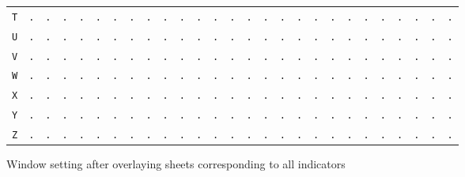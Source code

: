 \begin{figure}[H]
\begin{center}
{\begin{tabular}{c|cccccccccccccccccccccccccc}
				\texttt{T} & \texttt{.} & \texttt{.} & \texttt{.} & \texttt{.} & \texttt{.} & \texttt{.} & \texttt{.} & \texttt{.} & \texttt{.} & \texttt{.} & \texttt{.} & \texttt{.} & \texttt{.} & \texttt{.} & \texttt{.} & \texttt{.} & \texttt{.} & \texttt{.} & \texttt{.} & \texttt{.} & \texttt{.} & \texttt{.} & \texttt{.} & \texttt{.} & \texttt{.} & \texttt{.} \\
				\texttt{U} & \texttt{.} & \texttt{.} & \texttt{.} & \texttt{.} & \texttt{.} & \texttt{.} & \texttt{.} & \texttt{.} & \texttt{.} & \texttt{.} & \texttt{.} & \texttt{.} & \texttt{.} & \texttt{.} & \texttt{.} & \texttt{.} & \texttt{.} & \texttt{.} & \texttt{.} & \texttt{.} & \texttt{.} & \texttt{.} & \texttt{.} & \texttt{.} & \texttt{.} & \texttt{.} \\
				\texttt{V} & \texttt{.} & \texttt{.} & \texttt{.} & \texttt{.} & \texttt{.} & \texttt{.} & \texttt{.} & \texttt{.} & \texttt{.} & \texttt{.} & \texttt{.} & \texttt{.} & \texttt{.} & \texttt{.} & \texttt{.} & \texttt{.} & \texttt{.} & \texttt{.} & \texttt{.} & \texttt{.} & \texttt{.} & \texttt{.} & \texttt{.} & \texttt{.} & \texttt{.} & \texttt{.} \\
				\texttt{W} & \texttt{.} & \texttt{.} & \texttt{.} & \texttt{.} & \texttt{.} & \texttt{.} & \texttt{.} & \texttt{.} & \texttt{.} & \texttt{.} & \texttt{.} & \texttt{.} & \texttt{.} & \texttt{.} & \texttt{.} & \texttt{.} & \texttt{.} & \texttt{.} & \texttt{.} & \texttt{.} & \texttt{.} & \texttt{.} & \texttt{.} & \texttt{.} & \texttt{.} & \texttt{.} \\
				\texttt{X} & \texttt{.} & \texttt{.} & \texttt{.} & \texttt{.} & \texttt{.} & \texttt{.} & \texttt{.} & \texttt{.} & \texttt{.} & \texttt{.} & \texttt{.} & \texttt{.} & \texttt{.} & \texttt{.} & \texttt{.} & \texttt{.} & \texttt{.} & \texttt{.} & \texttt{.} & \texttt{.} & \texttt{.} & \texttt{.} & \texttt{.} & \texttt{.} & \texttt{.} & \texttt{.} \\
				\texttt{Y} & \texttt{.} & \texttt{.} & \texttt{.} & \texttt{.} & \texttt{.} & \texttt{.} & \texttt{.} & \texttt{.} & \texttt{.} & \texttt{.} & \texttt{.} & \texttt{.} & \texttt{.} & \texttt{.} & \texttt{.} & \texttt{.} & \texttt{.} & \texttt{.} & \texttt{.} & \texttt{.} & \texttt{.} & \texttt{.} & \texttt{.} & \texttt{.} & \texttt{.} & \texttt{.} \\
				\texttt{Z} & \texttt{.} & \texttt{.} & \texttt{.} & \texttt{.} & \texttt{.} & \texttt{.} & \texttt{.} & \texttt{.} & \texttt{.} & \texttt{.} & \texttt{.} & \texttt{.} & \texttt{.} & \texttt{.} & \texttt{.} & \texttt{.} & \texttt{.} & \texttt{.} & \texttt{.} & \texttt{.} & \texttt{.} & \texttt{.} & \texttt{.} & \texttt{.} & \texttt{.} & \texttt{.} \\
			\end{tabular}
		}
	\end{center}
	\caption{Window setting after overlaying sheets corresponding to all indicators}
\end{figure}
